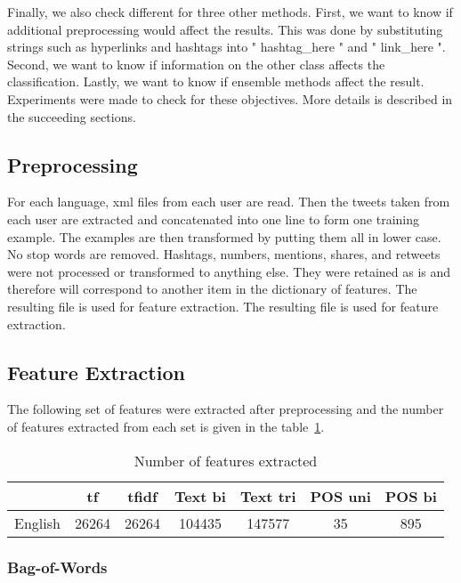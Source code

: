 \documentclass[a4paper]{llncs}
\begin{document}
Finally, we also check different for three other methods. First, we want to know if additional preprocessing would affect the results. This was done by substituting strings such as hyperlinks and hashtags into " hashtag\_here " and " link\_here ". Second, we want to know if information on the other class affects the classification. Lastly, we want to know if ensemble methods affect the result. Experiments were made to check for these objectives. More details is described in the succeeding sections.


\subsection{Preprocessing}
For each language, xml files from each user are read. Then the tweets taken from each user are extracted and concatenated into one line to form one training example. The examples are then transformed by putting them all in lower case. No stop words are removed. Hashtags, numbers, mentions, shares, and retweets were not processed or transformed to anything else. They were retained as is and therefore will correspond to another item in the dictionary of features. The resulting file is used for feature extraction.  The resulting file is used for feature extraction.  

\subsection{Feature Extraction}
The following set of features were extracted after preprocessing and the number of features extracted from each set is given in the table~\ref{table:numFeatures}.

\begin{table}[!htbp]
\setlength{\tabcolsep}{6pt}
\setlength{\extrarowheight}{5pt}
\centering
\begin{tabular}{c|c|c|c|c|c|c}

        & tf    & tfidf & Text  bi & Text tri & POS uni & POS bi \\ \hline
English & 26264 & 26264 & 104435   & 147577   & 35      & 895    \\ 

\end{tabular}
\caption{Number of features extracted}
\label{table:numFeatures}
\end{table}

\subsubsection{Bag-of-Words}
\end{document}
